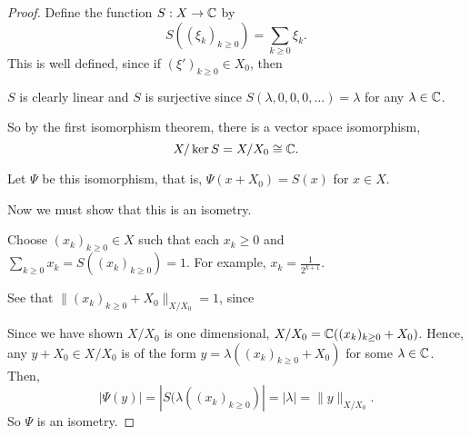 \documentclass{unswmaths}
\begin{document}
\begin{proof}
    Define the function $S:X\rightarrow \mathbb{C}$ by
    \begin{equation*}
        S((\xi_k)_{k\geq 0}) = \sum_{k\geq 0} \xi_k.
    \end{equation*}
    This is well defined, since if $(\xi')_{k\geq 0} \in X_0$, then 
%    


    $S$ is clearly linear and $S$ is surjective since $S(\lambda,0,0,0,\ldots) = \lambda$ for any $\lambda \in \mathbb{C}$.
    
    So by the first isomorphism theorem, there is a vector space isomorphism,
    \begin{equation*}
        X/\ker S = X/X_0 \cong \mathbb{C}.
    \end{equation*}
    
    Let $\Psi$ be this isomorphism, that is,
    $\Psi(x+X_0) = S(x)$ for $x \in X$.
    
    Now we must show that this is an isometry.
    
    Choose $(x_k)_{k\geq 0} \in X$ such that each $x_k \geq 0$
    and $\sum_{k\geq 0} x_k = S((x_k)_{k\geq 0}) = 1$. For example, $x_k = \frac{1}{2^{k+1}}$.
    
    See that $\|(x_k)_{k\geq 0}+X_0\|_{X/X_0} = 1$, since 
    
    
    Since we have shown $X/X_0$ is one dimensional, $X/X_0 = \mathbb{C}((x_k)_{k\geq 0}+X_0)$. Hence, any $y + X_0 \in X/X_0$
    is of the form $y = \lambda((x_k)_{k\geq 0}+X_0)$ for some $\lambda \in \mathbb{C}$. Then,
    \begin{equation*}
        |\Psi(y)| = |S(\lambda((x_k)_{k\geq 0})| = |\lambda| = \|y\|_{X/X_0}.
    \end{equation*}
    So $\Psi$ is an isometry.
\end{proof}
\end{document}
